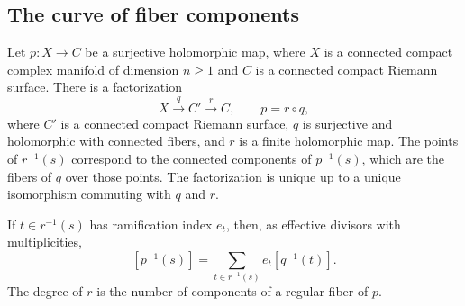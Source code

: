 \subsection{The curve of fiber components}

\begin{proposition}\label{draft649:curve-component-factor}
Let $p:X\to C$ be a surjective holomorphic map, where $X$ is a
connected compact complex manifold of dimension $n\geq1$ and
$C$ is a connected compact Riemann surface. There is a
factorization
\[
 X\xrightarrow{q}C'\xrightarrow{r}C,\qquad p=r\circ q,
\]
where $C'$ is a connected compact Riemann surface, $q$ is
surjective and holomorphic with connected fibers, and $r$ is a
finite holomorphic map. The points of $r^{-1}(s)$ correspond to
the connected components of $p^{-1}(s)$, which are the fibers
of $q$ over those points. The factorization is unique up to a
unique isomorphism commuting with $q$ and $r$.

If $t\in r^{-1}(s)$ has ramification index $e_t$, then, as
effective divisors with multiplicities,
\[
 [p^{-1}(s)]=\sum_{t\in r^{-1}(s)}e_t[q^{-1}(t)].
\]
The degree of $r$ is the number of components of a regular
fiber of $p$.
\end{proposition}
